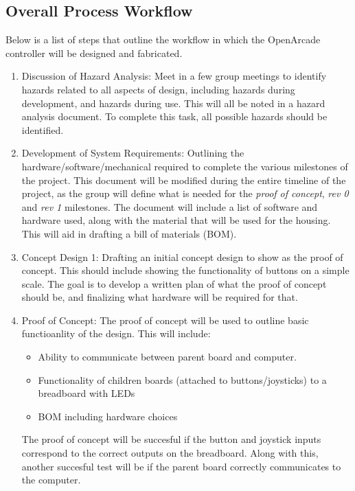 \documentclass[a4]{article}
\begin{document}
\subsection{Overall Process Workflow}
Below is a list of steps that outline the workflow in which the OpenArcade controller will be designed and fabricated.
\begin{enumerate}
    \item \textcolor{McMasterMaroon}{Discussion of Hazard Analysis}: Meet in a few group meetings to identify hazards related to all aspects of design, including hazards during development, and hazards during use. This will all be noted in a hazard analysis document. To complete this task, all possible hazards should be identified.
    \item \textcolor{McMasterMaroon}{Development of System Requirements}: Outlining the hardware/software/mechanical required to complete the various milestones of the project. This document will be modified during the entire timeline of the project, as the group will define what is needed for the \textit{proof of concept}, \textit{rev 0} and \textit{rev 1} milestones. The document will include a list of software and hardware used, along with the material that will be used for the housing. This will aid in drafting a bill of materials (BOM).
    \item \textcolor{McMasterMaroon}{Concept Design 1}: Drafting an initial concept design to show as the proof of concept. This should include showing the functionality of buttons on a simple scale. The goal is to develop a written plan of what the proof of concept should be, and finalizing what hardware will be required for that.
    \item \textcolor{McMasterMaroon}{Proof of Concept}: The proof of concept will be used to outline basic functioanlity of the design. This will include:
        \begin{itemize}
            \item Ability to communicate between parent board and computer.
            \item Functionality of children boards (attached to buttons/joysticks) to a breadboard with LEDs
            \item BOM including hardware choices
        \end{itemize}
    The proof of concept will be succesful if the button and joystick inputs correspond to the correct outputs on the breadboard. Along with this, another succesful test will be if the parent board correctly communicates to the computer.

\end{enumerate}
\end{document}
